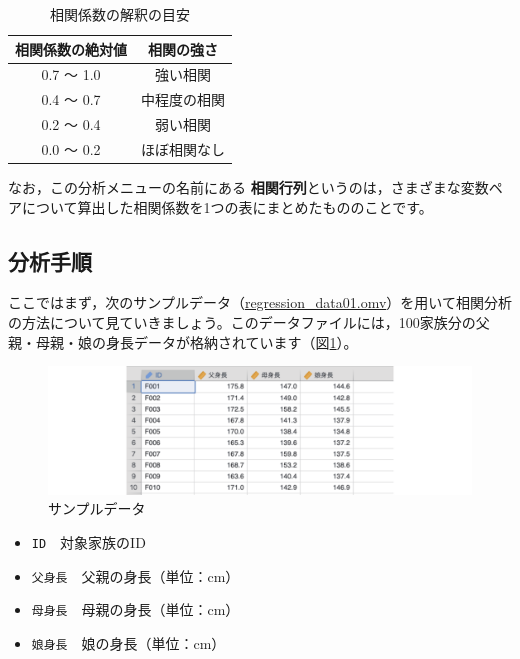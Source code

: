 \documentclass[
  12pt,
  a5jpaper,
  lualatex, ja=standard]{bxjsbook}
\providecommand{\tightlist}{%
  \setlength{\itemsep}{0pt}\setlength{\parskip}{0pt}}
\renewcommand{\emph}[1]{\textbf{\color{emph} #1}}
\newenvironment{jmvvar}{%
	\begin{center}%
	\begin{tcolorbox}[%
		title=変数一覧,
		colframe=daidai,
		colbacktitle=daidai!30!white,
		coltitle=daidai!10!black,
		colback=daidai!2!white,
		breakable,
		width=.9\textwidth
		]\small\addtolength{\leftmargini}{-3\labelsep}%
	}%
	{\end{tcolorbox}\end{center}}
\begin{document}
\begin{table}[H]

\caption{\label{tab:regression-correlation-pearson}相関係数の解釈の目安}
\centering
\begin{tabular}[t]{cc}
\toprule
相関係数の絶対値 & 相関の強さ\\
\midrule
0.7 〜 1.0 & 強い相関\\
0.4 〜 0.7 & 中程度の相関\\
0.2 〜 0.4 & 弱い相関\\
0.0 〜 0.2 & ほぼ相関なし\\
\bottomrule
\end{tabular}
\end{table}

なお，この分析メニューの名前にある\emph{相関行列}というのは，さまざまな変数ペアについて算出した相関係数を1つの表にまとめたもののことです。

\hypertarget{sub:regression-correlation-analysis}{%
\subsection{分析手順}\label{sub:regression-correlation-analysis}}

ここではまず，次のサンプルデータ（\href{https://github.com/sbtseiji/jmv_compguide/raw/main/data/omv/regression_data01.omv}{regression\_data01.omv}）を用いて相関分析の方法について見ていきましょう。このデータファイルには，100家族分の父親・母親・娘の身長データが格納されています（図\ref{fig:regression-data01}）。

\begin{figure}[!ht]

{\centering \includegraphics[width=1\linewidth]{images/regression/data01} 

}

\caption{サンプルデータ}\label{fig:regression-data01}
\end{figure}

\begin{jmvvar}

\begin{itemize}
\tightlist
\item
  \texttt{ID}　対象家族のID
\item
  \texttt{父身長}　父親の身長（単位：cm）
\item
  \texttt{母身長}　母親の身長（単位：cm）
\item
  \texttt{娘身長}　娘の身長（単位：cm）
\end{itemize}

\end{jmvvar}
\end{document}
